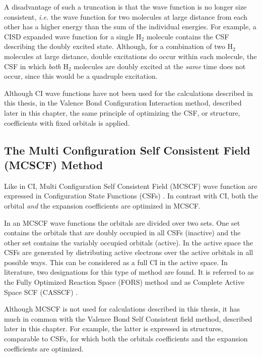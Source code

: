 A disadvantage of such a truncation is that the wave function is no longer size consistent, \textit{i.e.} the wave function for two molecules at large distance from each other has a higher energy than the sum of the individual energies. For example, a CISD expanded wave function for a single H$_2$ molecule contains the CSF describing the doubly excited state. Although, for a combination of two H$_2$ molecules at large distance, double excitations do occur within each molecule, the CSF in which \textit{both} H$_2$ molecules are doubly excited at the \textit{same} time does not occur, since this would be a quadruple excitation.

Although CI wave functions have not been used for the calculations described in this thesis, in the Valence Bond Configuration Interaction method, described later in this chapter, the same principle of optimizing the CSF, or structure, coefficients with fixed orbitals is applied.

\subsection{\label{ch1.sec.mcscf}The Multi Configuration Self Consistent Field (MCSCF) Method}
Like in CI, Multi Configuration Self Consistent Field (MCSCF) wave function are expressed in Configuration State Functions (CSFs) \cite{wahldasbook,daswahl}. In contrast with CI, both the orbital \textit{and} the expansion coefficients are optimized in MCSCF.

In an MCSCF wave functions the orbitals are divided over two sets. One set contains the orbitals that are doubly occupied in all CSFs (inactive) and the other set contains the variably occupied orbitals (active). In the active space the CSFs are generated by distributing active electrons over the active orbitals in all possible ways. This can be considered as a full CI in the active space. In literature, two designations for this type of method are found. It is referred to as the Fully Optimized Reaction Space (FORS) method \cite{fors1,fors2,fors3} and as Complete Active Space SCF (CASSCF) \cite{roos1,roos2}.

Although MCSCF is not used for calculations described in this thesis, it has much in common with the Valence Bond Self Consistent field method, described later in this chapter. For example, the latter is expressed in structures, comparable to CSFs, for which both the orbitals coefficients and the expansion coefficients are optimized. 

